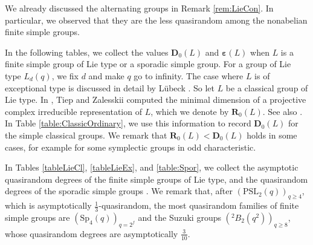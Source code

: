 \documentclass{daj}
\theoremstyle{definition}
\theoremstyle{remark}
\newcommand{\PSL}{\mathrm{PSL}}
\newcommand{\D}{\mathbf{D}}
\newcommand{\Di}{\mathbf{R}}
\renewcommand{\a}{\boldsymbol{\varepsilon}}
\begin{document}
We already discussed the alternating groups in Remark \ref{rem:LieCon}.
In particular, we observed that they are the less quasirandom among the nonabelian finite simple groups.

In the following tables, we collect the values $\D_0(L)$ and $\a(L)$ when $L$ is a finite simple group of Lie type or a sporadic simple group.
For a group of Lie type $L_d(q)$, we fix $d$ and make $q$ go to infinity.
The case where $L$ is of exceptional type is discussed in detail by L\"ubeck \cite{Lub01}.
So let $L$ be a classical group of Lie type.
In \cite{TZ96}, Tiep and Zalesskii computed the minimal dimension of a projective complex irreducible representation of $L$,
which we denote by $\Di_0(L)$. See also \cite{MM21}.
 In Table \ref{table:ClassicOrdinary}, we use this information to record $\D_0(L)$ for the simple classical groups.
 We remark that $\Di_0(L) < \D_0(L)$ holds in some cases, for example for some symplectic groups in odd characteristic.
 
 In Tables \ref{tableLieCl}, \ref{tableLieEx}, and \ref{table:Spor},
we collect the asymptotic quasirandom degrees of the finite simple groups of Lie type,
and the quasirandom degrees of the sporadic simple groups \cite{ATLAS}.
We remark that, after $(\PSL_2(q))_{q \geq 4}$, which is asymptotically $\frac{1}{3}$-quasirandom,
the most quasirandom families of finite simple groups are
$(\mathrm{Sp}_4(q))_{q =2^f}$ and the Suzuki groups $(^2B_2(q^2))_{q \geq 8}$,
whose quasirandom degrees are asymptotically $\frac{3}{10}$.
\end{document}

